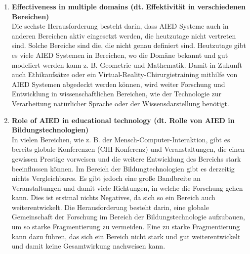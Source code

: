 \begin{enumerate}
      \item \textbf{Effectiveness in multiple domains (dt. Effektivität in verschiedenen Bereichen)} \\
            Die sechste Herausforderung besteht darin, dass AIED Systeme auch in anderen Bereichen aktiv eingesetzt werden, die heutzutage nicht vertreten sind. Solche Bereiche sind die, die nicht genau definiert sind.
            Heutzutage gibt es viele AIED Systemen in Bereichen, wo die Domäne bekannt und gut modeliert werden kann z. B. Geometrie und Mathematik.
            Damit in Zukunft auch Ethikaufsätze oder ein Virtual-Reality-Chirurgietraining mithilfe von AIED Systemen abgedeckt werden können, wird weiter Forschung und Entwicklung in  wissenschaftlichen Bereichen, wie der Technologie zur Verarbeitung natürlicher Sprache oder der Wissensdarstellung benötigt. \cite[S. 11f]{Pinkwart.2016}


      \item \textbf{Role of \ac{AIED} in educational technology (dt. Rolle von \ac{AIED} in Bildungstechnologien)} \\
            In vielen Bereichen, wie z. B. der Mensch-Computer-Interaktion, gibt es bereits globale Konferenzen (CHI-Konferenz) und Veranstaltungen, die einen gewissen Prestige vorweisen und die weitere Entwicklung des Bereichs stark beeinflussen können.
            Im Bereich der Bildungtechnologien gibt es derzeitig nichts Vergleichbares.
            Es gibt jedoch eine große Bandbreite an Veranstaltungen und damit viele Richtungen, in welche die Forschung gehen kann.
            Dies ist erstmal nichts Negatives, da sich so ein Bereich auch weiterentwickelt.
            Die Herausforderung besteht darin, eine globale Gemeinschaft der Forschung im Bereich der Bildungstechnologie aufzubauen, um so starke Fragmentierung zu vermeiden.
            Eine zu starke Fragmentierung kann dazu führen, das sich ein Bereich nicht stark und gut weiterentwickelt und damit keine Gesamtwirkung nachweisen kann. \cite[S. 12]{Pinkwart.2016}

\end{enumerate}